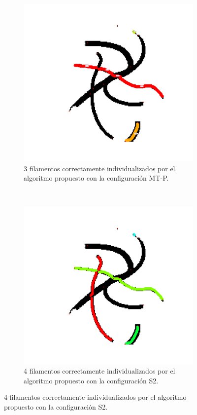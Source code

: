 \begin{figure}[h!]
    \begin{subfigure}[t]{0.49\textwidth}
        \centering
        \includegraphics[scale=0.11]{resultImages/define-weighted-4-phil-s0-v05-exactMatch-antLabeled.png}
        \caption{3 filamentos correctamente individualizados por el algoritmo propuesto con la configuraci\'on MT-P.}
        \label{fig:SynthDefine-Individualizacion-BestP1}
    \end{subfigure}
    ~
    \begin{subfigure}[t]{0.49\textwidth}
        \centering
        \includegraphics[scale=0.11]{resultImages/define-weighted-4-phil-s3389-v056-exactMatch-antLabeled.png}
        \caption{4 filamentos correctamente individualizados por el algoritmo propuesto con la configuraci\'on S2.}
        \label{fig:SynthDefine-Individualizacion-BestP2}
    \end{subfigure}
    

\end{figure}

